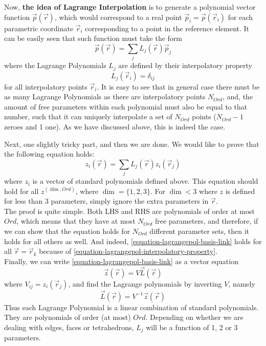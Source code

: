 \documentclass[12pt]{article}
\begin{document}
\noindent
Now, \textbf{the idea of Lagrange Interpolation} is to generate a polynomial vector function $\vec{p}(\vec{r})$, which would correspond to a real point $\vec{p}_i = \vec{p}(\vec{r}_i)$ for each parametric coordinate $\vec{r}_i$ corresponding to a point in the reference element. It can be easily seen that such function must take the form
\begin{equation}
	\vec{p}(\vec{r}) = \sum_j L_j(\vec{r})\vec{p}_j 
\end{equation}
\noindent
where the Lagrange Polynomials $L_j$ are defined by their interpolatory property
\begin{equation}
	\label{equation-lagrangepol-interpolatory-property}
	L_j(\vec{r}_i) = \delta_{ij}
\end{equation}
\noindent
for all interpolatory points $\vec{r}_i$. It is easy to see that in general case there must be as many Lagrange Polynomials as there are interpolatory points $N_{Ord}$, and, the amount of free parameters within each polynomial must also be equal to that number, such that it can uniquely interpolate a set of $N_{Ord}$ points ($N_{Ord} - 1$ zeroes and 1 one). As we have discussed above, this is indeed the case.

\noindent
Next, one slightly tricky part, and then we are done. We would like to prove that the following equation holds:
\begin{equation}
	\label{equation-lagrangepol-basis-link}
	z_i(\vec{r}) = \sum_j L_j(\vec{r}) z_i (\vec{r}_j) 
\end{equation}
\noindent
where $z_i$ is a vector of standard polynomials defined above. This equation should hold for all $z^{(\dim, Ord)}$, where $\dim = \{1,2,3\}$. For $\dim < 3$ where $z$ is defined for less than 3 parameters, simply ignore the extra parameters in $\vec{r}$. \\

\noindent
The proof is quite simple. Both LHS and RHS are polynomials of order at most $Ord$, which means that they have at most $N_{Ord}$ free parameters, and therefore, if we can show that the equation holds for $N_{Ord}$ different parameter sets, then it holds for all others as well. And indeed, \eqref{equation-lagrangepol-basis-link} holds for all $\vec{r} = \vec{r}_k$ because of \eqref{equation-lagrangepol-interpolatory-property}. \\

\noindent
Finally, we can write \eqref{equation-lagrangepol-basis-link} as a vector equation
\begin{equation}
	\vec{z} (\vec{r}) = V \vec{L} (\vec{r})
\end{equation}
\noindent
where $V_{ij} = z_i (\vec{r}_j)$, and find the Lagrange polynomials by inverting $V$, namely
\begin{equation}
	\vec{L} (\vec{r}) = V^{-1} \vec{z} (\vec{r})
\end{equation}
\noindent
Thus each Lagrange Polynomial is a linear combination of standard polynomials. They are polynomials of order (at most) $Ord$. Depending on whether we are dealing with edges, faces or tetrahedrons, $L_j$ will be a function of 1, 2 or 3 parameters.
\end{document}
